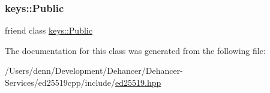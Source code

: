 \subsubsection{\texorpdfstring{keys::Public}{keys::Public}}
{\footnotesize\ttfamily friend class \mbox{\hyperlink{classed25519_1_1keys_1_1_public}{keys\+::\+Public}}\hspace{0.3cm}{\ttfamily [friend]}}



The documentation for this class was generated from the following file\+:\begin{DoxyCompactItemize}
\item 
/\+Users/denn/\+Development/\+Dehancer/\+Dehancer-\/\+Services/ed25519cpp/include/\mbox{\hyperlink{ed25519_8hpp}{ed25519.\+hpp}}\end{DoxyCompactItemize}

